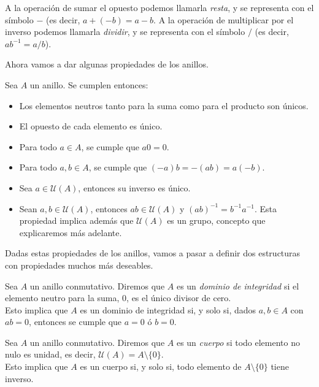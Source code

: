 A la operación de sumar el opuesto podemos llamarla \textit{resta}, y se representa con el símbolo $-$ (es decir, $a + (-b) = a - b$. A la operación de multiplicar por el inverso podemos llamarla \textit{dividir}, y se representa con el símbolo $/$ (es decir, $ab^{-1} = a/b$).

Ahora vamos a dar algunas propiedades de los anillos.

\begin{proposicion}
	Sea $A$ un anillo. Se cumplen entonces:
	
	\begin{itemize}
		\item Los elementos neutros tanto para la suma como para el producto son únicos.
		
		\item El opuesto de cada elemento es único.
		
		\item Para todo $a \in A$, se cumple que $a0 = 0$.
		
		\item Para todo $a, b \in A$, se cumple que $(-a)b = -(ab) = a(-b)$.
		
		\item Sea $a \in \mathcal{U}(A)$, entonces su inverso es único.
		
		\item Sean $a, b \in \mathcal{U}(A)$, entonces $ab \in \mathcal{U}(A)$ y $(ab)^{-1} = b^{-1}a^{-1}$. Esta propiedad implica además que $\mathcal{U}(A)$ es un grupo, concepto que explicaremos más adelante.
	\end{itemize}
\end{proposicion}

Dadas estas propiedades de los anillos, vamos a pasar a definir dos estructuras con propiedades muchos más deseables.

\begin{definicion}
	Sea $A$ un anillo conmutativo. Diremos que $A$ es un \textit{dominio de integridad} si el elemento neutro para la suma, $0$, es el único divisor de cero.\\
	
	Esto implica que $A$ es un dominio de integridad si, y solo si, dados $a, b \in A$ con $ab = 0$, entonces se cumple que $a = 0$ ó $b = 0$.
\end{definicion}

\begin{definicion}
	Sea $A$ un anillo conmutativo. Diremos que $A$ es un \textit{cuerpo} si todo elemento no nulo es unidad, es decir, $\mathcal{U}(A) = A \setminus \{0\}$.\\
	
	Esto implica que $A$ es un cuerpo si, y solo si, todo elemento de $A \setminus \{0\}$ tiene inverso.
\end{definicion}

